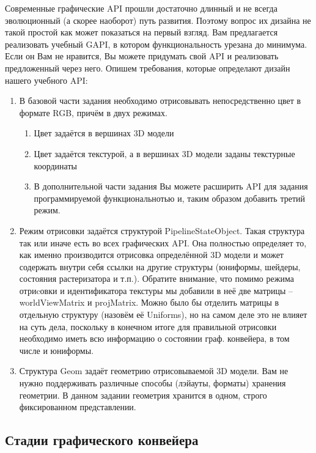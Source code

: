 \documentclass[12pt,subf,href,colorlinks=true]{article}
\begin{document}
Современные графические API прошли достаточно длинный и не всегда эволюционный (а скорее наоборот) путь развития. Поэтому вопрос их дизайна не такой простой как может показаться на первый взгляд. Вам предлагается реализовать учебный GAPI, в котором функциональность урезана до минимума. Если он Вам не нравится, Вы можете придумать свой API и реализовать предложенный через него. Опишем требования, которые определают дизайн нашего учебного API:

\begin{enumerate}
\item В базовой части задания необходимо отрисовывать непосредственно цвет в формате RGB, причём в двух режимах.
\begin{enumerate}
\item Цвет задаётся в вершинах 3D модели
\item Цвет задаётся текстурой, а в вершинах 3D модели заданы текстурные координаты
\item В дополнительной части задания Вы можете расширить API для задания программируемой функциональнотью и, таким образом добавить третий режим.
\end{enumerate}

\item Режим отрисовки задаётся структурой PipelineStateObject. Такая структура так или иначе есть во всех графических API. Она полностью определяет то, как именно производится отрисовка определённой 3D модели и может содержать внутри себя ссылки на другие структуры (юниформы, шейдеры, состояния растеризатора и т.п.). Обратите внимание, что помимо режима отриcовки и идентификатора текстуры мы добавили в неё две матрицы -- worldViewMatrix и projMatrix. Можно было бы отделить матрицы в отдельную структуру (назовём её Uniforms), но на самом деле это не влияет на суть дела, поскольку в конечном итоге для правильной отрисовки необходимо иметь всю информацию о состоянии граф. конвейера, в том числе и юниформы.

\item Структура Geom задаёт геометрию отрисовываемой 3D модели. Вам не нужно поддерживать различные способы (лэйауты, форматы) хранения геометрии. В данном задании геометрия хранится в одном, строго фиксированном представлении.

\end{enumerate}

\subsection{Стадии графического конвейера}
\end{document}

